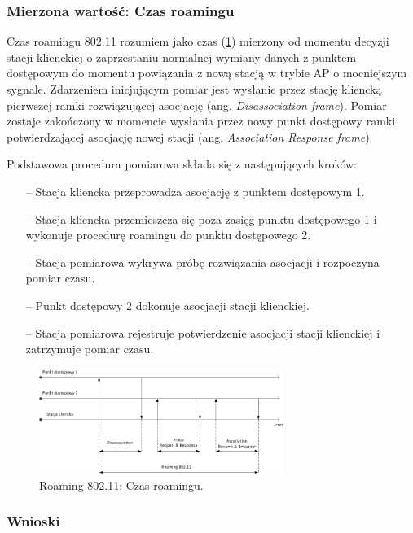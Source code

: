 \subsubsection{Mierzona wartość: Czas roamingu}
Czas roamingu 802.11 rozumiem jako czas (\ref{RoamingTime}) mierzony od momentu decyzji stacji klienckiej o zaprzestaniu normalnej wymiany danych z punktem dostępowym do momentu powiązania z nową stacją w trybie AP o mocniejszym sygnale. Zdarzeniem inicjującym pomiar jest wysłanie przez stację kliencką pierwszej ramki rozwiązującej asocjację (ang. \emph{Disassociation frame}). Pomiar zostaje zakończony w momencie wysłania przez nowy punkt dostępowy ramki potwierdzającej asocjację nowej stacji (ang. \emph{Association Response frame}).

Podstawowa procedura pomiarowa składa się z następujących kroków:
\begin{itemize}
\item[--] Stacja kliencka przeprowadza asocjację z punktem dostępowym 1.
\item[--] Stacja kliencka przemieszcza się poza zasięg punktu dostępowego 1 i wykonuje procedurę roamingu do punktu dostępowego 2.
\item[--] Stacja pomiarowa wykrywa próbę rozwiązania asocjacji i rozpoczyna pomiar czasu.
\item[--] Punkt dostępowy 2 dokonuje asocjacji stacji klienckiej.
\item[--] Stacja pomiarowa rejestruje potwierdzenie asocjacji stacji klienckiej i zatrzymuje pomiar czasu.
\end{itemize}

\begin{figure}[htb]
\begin{center}
\includegraphics[width=300px]{img/RoamingTime}
\caption{Roaming 802.11: Czas roamingu.}
\label{RoamingTime}
\end{center}
\end{figure}

\subsubsection{Wnioski}
